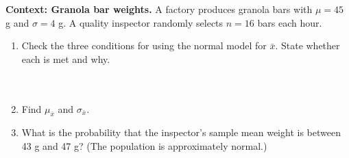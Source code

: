 \documentclass[10pt]{article}
\begin{document}
\namepartnerperiod

\vspace{0.1in}

\begin{tcolorbox}[colback=redbg, colframe=black!40, boxrule=0.6pt, arc=2mm,
    left=3mm, right=3mm, top=2mm, bottom=2mm, title=\textbf{Tier R --- Remediate}]
\textbf{Context: Granola bar weights.}
A factory produces granola bars with $\mu = 45$ g and $\sigma = 4$ g.
A quality inspector randomly selects $n = 16$ bars each hour.

\begin{enumerate}
  \item Check the three conditions for using the normal model for $\bar{x}$. State whether
        each is met and why.
        \ansline{}\\
        \\
        \\
  \item Find $\mu_{\bar{x}}$ and $\sigma_{\bar{x}}$.
        \par\vspace{-\parskip}\nointerlineskip\noindent\begin{minipage}[t][0.6in][t]{\linewidth}\vspace*{2pt}\end{minipage}
  \item What is the probability that the inspector's sample mean weight is between 43 g
        and 47 g? (The population is approximately normal.)
        \par\vspace{-\parskip}\nointerlineskip\noindent\begin{minipage}[t][1.0in][t]{\linewidth}\vspace*{2pt}\\
        \end{minipage}
\end{enumerate}
\end{tcolorbox}

\vspace{0.15in}
\end{document}
